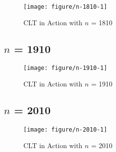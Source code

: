 \documentclass[11pt,letter]{article}\usepackage[]{graphicx}\usepackage[]{color}
\makeatletter
\def\maxwidth{ %
  \ifdim\Gin@nat@width>\linewidth
    \linewidth
  \else
    \Gin@nat@width
  \fi
}
\newenvironment{knitrout}{}{} %
\makeatother
\begin{document}
\begin{knitrout}
\color{fgcolor}\begin{figure}[h]

{\centering \texttt{[image: figure/n-1810-1]} 

}

\caption[CLT in Action with $n$ = 1810]{CLT in Action with $n$ = 1810}\label{fig:n-1810}
\end{figure}


\end{knitrout}
\newpage
\subsection{$n$ = 1910}

\begin{knitrout}
\color{fgcolor}\begin{figure}[h]

{\centering \texttt{[image: figure/n-1910-1]} 

}

\caption[CLT in Action with $n$ = 1910]{CLT in Action with $n$ = 1910}\label{fig:n-1910}
\end{figure}


\end{knitrout}
\newpage
\subsection{$n$ = 2010}

\begin{knitrout}
\color{fgcolor}\begin{figure}[h]

{\centering \texttt{[image: figure/n-2010-1]} 

}

\caption[CLT in Action with $n$ = 2010]{CLT in Action with $n$ = 2010}\label{fig:n-2010}
\end{figure}


\end{knitrout}



\FloatBarrier


\newpage
\appendix
\end{document}
